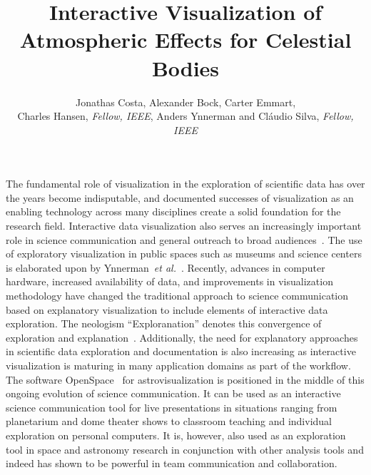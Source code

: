\documentclass[journal]{vgtc}                %
\title{Interactive Visualization of Atmospheric Effects for Celestial Bodies}
\author{Jonathas Costa, Alexander Bock, Carter Emmart, \\Charles Hansen, \textit{Fellow, IEEE}, Anders Ynnerman and Cl\'audio Silva, \textit{Fellow, IEEE}}
\newcommand{\etal}{\emph{et al.}}
\begin{document}

\maketitle




The fundamental role of visualization in the exploration of scientific data has over the years become indisputable, and documented successes of visualization as an enabling technology across many disciplines create a solid foundation for the research field. Interactive data visualization also serves an increasingly important role in science communication and general outreach to broad audiences~\cite{ynnerman:16:inside}. The use of exploratory visualization in public spaces such as museums and science centers is elaborated upon by Ynnerman~\etal ~\cite{ynnerman:exploranation}. Recently, advances in computer hardware, increased availability of data, and improvements in visualization methodology have changed the traditional approach to science communication based on explanatory visualization to include elements of interactive data exploration.
The neologism ``Exploranation'' denotes this convergence of exploration and explanation~\cite{ynnerman:exploranation}. Additionally, the need for explanatory approaches in scientific data exploration and documentation is also increasing as interactive visualization is maturing in many application domains as part of the workflow. The software OpenSpace~\cite{OpenSpace:2020} for astrovisualization is positioned in the middle of this ongoing evolution of science communication. It can be used as an interactive science communication tool for live presentations in situations ranging from planetarium and dome theater shows to classroom teaching and individual exploration on personal computers. It is, however, also used as an exploration tool in space and astronomy research in conjunction with other analysis tools and indeed has shown to be powerful in team communication and collaboration. 
\end{document}
